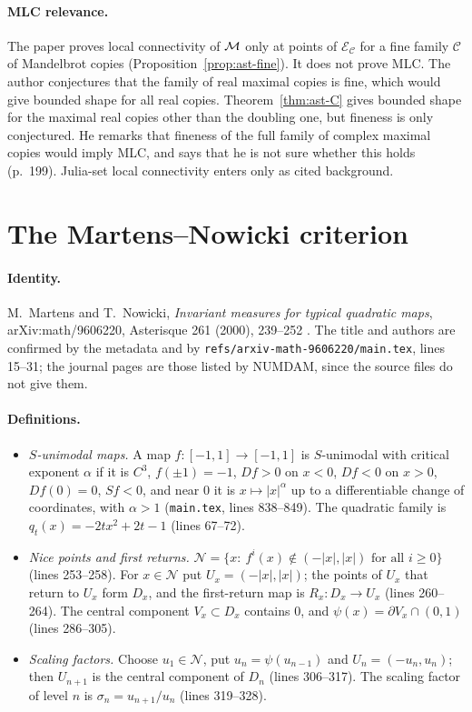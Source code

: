 \paragraph{MLC relevance.}
The paper proves local connectivity of $\mathcal M$ only at points of $\mathcal E_{\mathcal C}$ for a fine family $\mathcal C$ of
Mandelbrot copies (Proposition~\ref{prop:ast-fine}).  It does not prove MLC.  The author conjectures that the family of real maximal
copies is fine, which would give bounded shape for all real copies.  Theorem~\ref{thm:ast-C} gives bounded shape for the maximal real copies other than the doubling one, but fineness is only conjectured.  He remarks that
fineness of the full family of complex maximal copies would imply MLC, and says that he is not sure whether this holds (p.~199).  Julia-set local connectivity enters only as cited background.

\section{The Martens--Nowicki criterion}
\label{sec:martens-nowicki}

\paragraph{Identity.}
M.~Martens and T.~Nowicki, \emph{Invariant measures for typical quadratic maps}, arXiv:math/9606220, Asterisque 261
(2000), 239--252 \cite{MartensNowicki}.  The title and authors are confirmed by the metadata and by
\texttt{refs/arxiv-math-9606220/main.tex}, lines 15--31; the journal pages are those listed by NUMDAM, since the
source files do not give them.

\paragraph{Definitions.}
\begin{itemize}
\item \emph{$S$-unimodal maps.}  A map $f\colon[-1,1]\to[-1,1]$ is $S$-unimodal with critical exponent $\alpha$ if it is
$C^3$, $f(\pm1)=-1$, $Df>0$ on $x<0$, $Df<0$ on $x>0$, $Df(0)=0$, $Sf<0$, and near $0$ it is $x\mapsto|x|^\alpha$ up to a
differentiable change of coordinates, with $\alpha>1$ (\texttt{main.tex}, lines 838--849).  The quadratic family is
$q_t(x)=-2tx^2+2t-1$ (lines 67--72).
\item \emph{Nice points and first returns.}  $\mathcal N=\{x:\ f^i(x)\notin(-|x|,|x|)\text{ for all }i\ge0\}$ (lines 253--258).
For $x\in\mathcal N$ put $U_x=(-|x|,|x|)$; the points of $U_x$ that return to $U_x$ form $D_x$, and the first-return map is
$R_x\colon D_x\to U_x$ (lines 260--264).  The central component $V_x\subset D_x$ contains $0$, and $\psi(x)=\partial V_x\cap(0,1)$
(lines 286--305).
\item \emph{Scaling factors.}  Choose $u_1\in\mathcal N$, put $u_n=\psi(u_{n-1})$ and $U_n=(-u_n,u_n)$; then $U_{n+1}$ is the
central component of $D_n$ (lines 306--317).  The scaling factor of level $n$ is $\sigma_n=u_{n+1}/u_n$ (lines 319--328).
\end{itemize}


